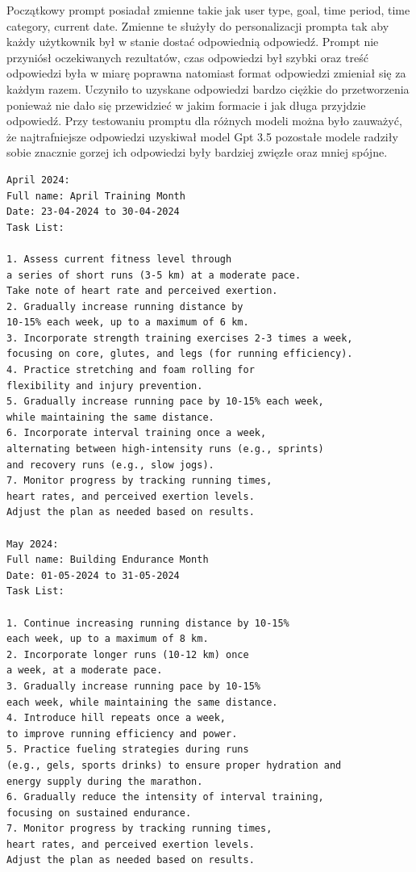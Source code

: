 Początkowy prompt posiadał zmienne takie jak user type, goal, time period, time category, current date. Zmienne te służyły do personalizacji prompta tak aby każdy użytkownik był w stanie dostać odpowiednią odpowiedź. Prompt nie przyniósł oczekiwanych rezultatów, czas odpowiedzi był szybki oraz treść odpowiedzi była w miarę poprawna natomiast format odpowiedzi zmieniał się za każdym razem. Uczyniło to uzyskane odpowiedzi bardzo ciężkie do przetworzenia ponieważ nie dało się przewidzieć w jakim formacie i jak długa przyjdzie odpowiedź. Przy testowaniu promptu dla różnych modeli można było zauważyć, że najtrafniejsze odpowiedzi uzyskiwał model Gpt 3.5 pozostałe modele radziły sobie znacznie gorzej ich odpowiedzi były bardziej zwięzłe oraz mniej spójne.

\begin{lstlisting}[language=html, caption=Przykład odpowiedzi modelu Llama2, linewidth=140mm]
April 2024:
Full name: April Training Month
Date: 23-04-2024 to 30-04-2024
Task List:

1. Assess current fitness level through
a series of short runs (3-5 km) at a moderate pace. 
Take note of heart rate and perceived exertion.
2. Gradually increase running distance by
10-15% each week, up to a maximum of 6 km.
3. Incorporate strength training exercises 2-3 times a week, 
focusing on core, glutes, and legs (for running efficiency).
4. Practice stretching and foam rolling for 
flexibility and injury prevention.
5. Gradually increase running pace by 10-15% each week, 
while maintaining the same distance.
6. Incorporate interval training once a week, 
alternating between high-intensity runs (e.g., sprints) 
and recovery runs (e.g., slow jogs).
7. Monitor progress by tracking running times, 
heart rates, and perceived exertion levels. 
Adjust the plan as needed based on results.

May 2024:
Full name: Building Endurance Month
Date: 01-05-2024 to 31-05-2024
Task List:

1. Continue increasing running distance by 10-15% 
each week, up to a maximum of 8 km.
2. Incorporate longer runs (10-12 km) once 
a week, at a moderate pace.
3. Gradually increase running pace by 10-15% 
each week, while maintaining the same distance.
4. Introduce hill repeats once a week, 
to improve running efficiency and power.
5. Practice fueling strategies during runs 
(e.g., gels, sports drinks) to ensure proper hydration and 
energy supply during the marathon.
6. Gradually reduce the intensity of interval training, 
focusing on sustained endurance.
7. Monitor progress by tracking running times, 
heart rates, and perceived exertion levels. 
Adjust the plan as needed based on results.
\end{lstlisting}

